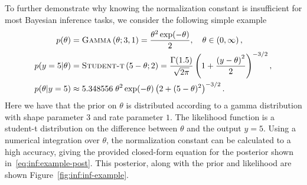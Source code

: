 To further demonstrate why knowing the normalization constant is insufficient
for most Bayesian inference tasks, we consider the following simple example
\begin{subequations}
\label{eq:inf:example}
\begin{align}
p(\theta) &= \textsc{Gamma}\left(\theta; 3, 1\right) = \frac{\theta^2 \exp(-\theta)}{2},
 \quad \theta\in\left(0,\infty\right), \\
p(y=5|\theta) &= \textsc{Student-t}\left(5-\theta;2\right) = 
\frac{\Gamma (1.5)}{\sqrt{2\pi}}\left(1+\frac{\left(y-\theta\right)^2}{2}\right)^{-3/2}, \\
p(\theta |y=5) &\approx 5.348556 \; \theta^2
	 \exp(-\theta)\left(2+(5-\theta)^2\right)^{-3/2}\label{eq:inf:example-post}.
\end{align}
\end{subequations}
Here we have that the prior on $\theta$ is distributed according to a gamma
distribution with shape parameter $3$ and rate parameter $1$.  The likelihood
function is a student-t distribution on the difference between $\theta$ and the
output $y=5$.  Using a numerical integration over $\theta$, the normalization
constant can be calculated to a high accuracy, giving the provided closed-form
equation for the posterior shown in~\eqref{eq:inf:example-post}.  This posterior, along with the prior and likelihood are shown Figure~\ref{fig:inf:inf-example}.

